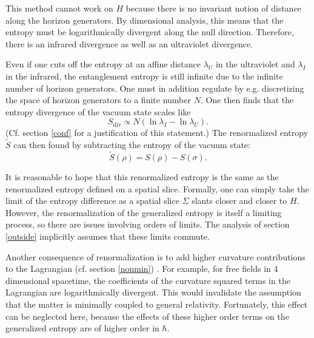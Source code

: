 \documentclass[12pt]{article}
\begin{document}
This method cannot work on $H$ because there is no invariant notion of distance along the horizon generators.  By dimensional analysis, this means that the entropy must be logarithmically divergent along the null direction.  Therefore, there is an infrared divergence as well as an ultraviolet divergence.

Even if one cuts off the entropy at an affine distance $\lambda_U$ in the ultraviolet and $\lambda_I$ in the infrared, the entanglement entropy is still infinite due to the infinite number of horizon generators.  One must in addition regulate by e.g. discretizing the space of horizon generators to a finite number $N$.  One then finds that the entropy divergence of the vacuum state scales like
\begin{equation}\label{nulldiv}
S_\mathrm{div} \propto N (\ln \lambda_I - \ln \lambda_U).
\end{equation}
(Cf. section \ref{conf} for a justification of this statement.)  The renormalized entropy $\tilde{S}$ can then found by subtracting the entropy of the vacuum state:
\begin{equation}
\tilde{S}(\rho) = S(\rho) - S(\sigma).
\end{equation}

It is reasonable to hope that this renormalized entropy is the same as the renormalized entropy defined on a spatial slice.  Formally, one can simply take the limit of the entropy difference as a spatial slice $\Sigma$ slants closer and closer to $H$.  However, the renormalization of the generalized entropy is itself a limiting process, so there are issues involving orders of limits.  The analysis of section \ref{outside} implicitly assumes that these limits commute.

Another consequence of renormalization is to add higher curvature contributions to the Lagrangian (cf. section \ref{nonmin}) \cite{jacobson94}.  For example, for free fields in 4 dimensional spacetime, the coefficients of the curvature squared terms in the Lagrangian are logarithmically divergent.  This would invalidate the assumption that the matter is minimally coupled to general relativity.  Fortunately, this effect can be neglected here, because the effects of these higher order terms on the generalized entropy are of higher order in $\hbar$.

\end{document}
